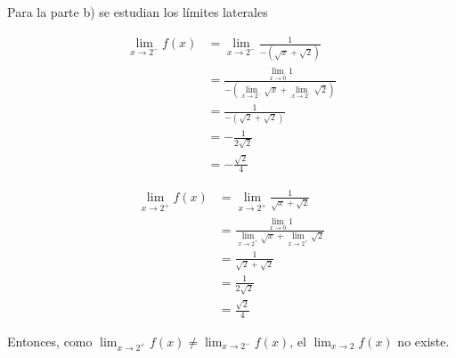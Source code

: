 \begin{soluciones}
  Para la parte b) se estudian los límites laterales

  $$
  \begin{aligned}
  \lim _{x \rightarrow 2^{-}} f(x) & =\lim _{x \rightarrow 2^{-}} \frac{1}{-(\sqrt{x}+\sqrt{2})} \\
  & =\frac{\lim _{x \rightarrow 0} 1}{-\left(\lim _{x \rightarrow 2^{-}} \sqrt{x}+\lim _{x \rightarrow 2^{-}} \sqrt{2}\right)} \\
  & =\frac{1}{-(\sqrt{2}+\sqrt{2})} \\
  & =-\frac{1}{2 \sqrt{2}} \\
  & =-\frac{\sqrt{2}}{4}
  \end{aligned}
  $$

  $$
  \begin{aligned}
  \lim _{x \rightarrow 2^{+}} f(x) & =\lim _{x \rightarrow 2^{+}} \frac{1}{\sqrt{x}+\sqrt{2}} \\
  & =\frac{\lim _{x \rightarrow 0} 1}{\lim _{x \rightarrow 2^{+}} \sqrt{x}+\lim _{x \rightarrow 2^{+}} \sqrt{2}} \\
  & =\frac{1}{\sqrt{2}+\sqrt{2}} \\
  & =\frac{1}{2 \sqrt{2}} \\
  & =\frac{\sqrt{2}}{4}
  \end{aligned}
  $$

  Entonces, como $\lim _{x \rightarrow 2^{+}} f(x) \neq \lim _{x \rightarrow 2^{-}} f(x)$, el $\lim _{x \rightarrow 2} f(x)$ no existe.
\end{soluciones}